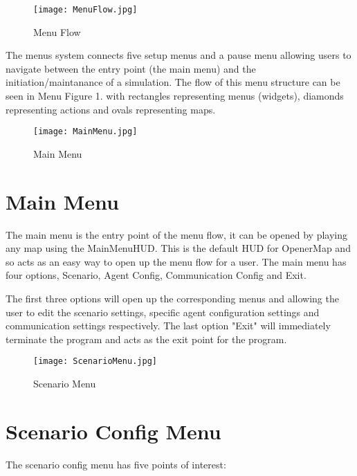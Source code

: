 \documentclass[../main.tex]{subfiles}
\begin{document}
\begin{figure}[H]
\texttt{[image: MenuFlow.jpg]}
\caption{Menu Flow}
\end{figure}

The menus system connects five setup menus and a pause menu allowing users to navigate between the entry point (the main menu) and the initiation/maintanance of a simulation. The flow of this menu structure can be seen in Menu Figure 1. with rectangles representing menus (widgets), diamonds representing actions and ovals representing maps.

\begin{figure}[H]
\texttt{[image: MainMenu.jpg]}
\caption{Main Menu}
\end{figure}

\break

\section{Main Menu}
The main menu is the entry point of the menu flow, it can be opened by playing any map using the MainMenuHUD. This is the default HUD for OpenerMap and so acts as an easy way to open up the menu flow for a user. The main menu has four options, Scenario, Agent Config, Communication Config and Exit.

The first three options will open up the corresponding menus and allowing the user to edit the scenario settings, specific agent configuration settings and communication settings respectively. The last option "Exit" will immediately terminate the program and acts as the exit point for the program.

\begin{figure}[H]
\texttt{[image: ScenarioMenu.jpg]}
\caption{Scenario Menu}
\end{figure}

\section{Scenario Config Menu}
The scenario config menu has five points of interest:
\end{document}
